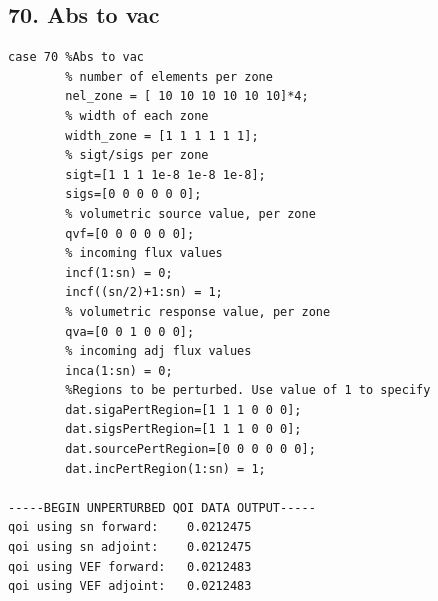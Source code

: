 \documentclass{article}
\begin{document}
\subsection{70. Abs to vac}
\begin{verbatim}
case 70 %Abs to vac
        % number of elements per zone
        nel_zone = [ 10 10 10 10 10 10]*4;
        % width of each zone
        width_zone = [1 1 1 1 1 1];
        % sigt/sigs per zone
        sigt=[1 1 1 1e-8 1e-8 1e-8];
        sigs=[0 0 0 0 0 0];
        % volumetric source value, per zone
        qvf=[0 0 0 0 0 0];
        % incoming flux values
        incf(1:sn) = 0;
        incf((sn/2)+1:sn) = 1;
        % volumetric response value, per zone
        qva=[0 0 1 0 0 0];
        % incoming adj flux values
        inca(1:sn) = 0;
        %Regions to be perturbed. Use value of 1 to specify
        dat.sigaPertRegion=[1 1 1 0 0 0];
        dat.sigsPertRegion=[1 1 1 0 0 0];
        dat.sourcePertRegion=[0 0 0 0 0 0];
        dat.incPertRegion(1:sn) = 1;   
        
-----BEGIN UNPERTURBED QOI DATA OUTPUT----- 
qoi using sn forward: 	 0.0212475 
qoi using sn adjoint: 	 0.0212475 
qoi using VEF forward: 	 0.0212483 
qoi using VEF adjoint: 	 0.0212483 
\end{verbatim}
\end{document}
